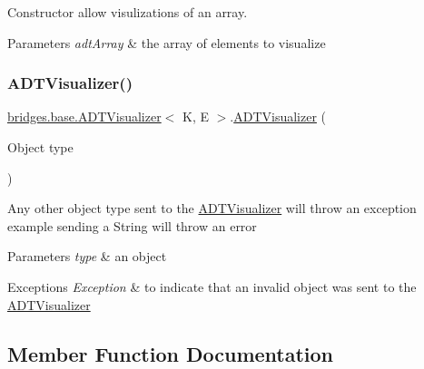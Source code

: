 Constructor allow visulizations of an array. 
\begin{DoxyParams}{Parameters}
{\em adt\+Array} & the array of elements to visualize \\
\hline
\end{DoxyParams}
\hypertarget{classbridges_1_1base_1_1_a_d_t_visualizer_af722d7ea9506b1ca8119ae39c43130ff}{}\label{classbridges_1_1base_1_1_a_d_t_visualizer_af722d7ea9506b1ca8119ae39c43130ff} 
\subsubsection{\texorpdfstring{A\+D\+T\+Visualizer()}{ADTVisualizer()}\hspace{0.1cm}{\footnotesize\ttfamily [3/3]}}
{\footnotesize\ttfamily \hyperlink{classbridges_1_1base_1_1_a_d_t_visualizer}{bridges.\+base.\+A\+D\+T\+Visualizer}$<$ K, E $>$.\hyperlink{classbridges_1_1base_1_1_a_d_t_visualizer}{A\+D\+T\+Visualizer} (\begin{DoxyParamCaption}\item[{Object}]{type }\end{DoxyParamCaption})}

Any other object type sent to the \hyperlink{classbridges_1_1base_1_1_a_d_t_visualizer}{A\+D\+T\+Visualizer} will throw an exception example sending a String will throw an error 
\begin{DoxyParams}{Parameters}
{\em type} & an object \\
\hline
\end{DoxyParams}

\begin{DoxyExceptions}{Exceptions}
{\em Exception} & to indicate that an invalid object was sent to the \hyperlink{classbridges_1_1base_1_1_a_d_t_visualizer}{A\+D\+T\+Visualizer} \\
\hline
\end{DoxyExceptions}


\subsection{Member Function Documentation}
\hypertarget{classbridges_1_1base_1_1_a_d_t_visualizer_a86ec26c0bb98a48a63366ce380ca958f}{}\label{classbridges_1_1base_1_1_a_d_t_visualizer_a86ec26c0bb98a48a63366ce380ca958f} 
